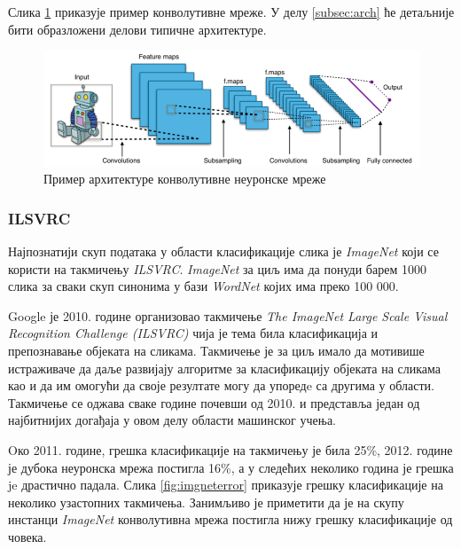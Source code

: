 \documentclass[a4paper]{article}
\begin{document}
Слика \ref{fig:cnn} приказује пример конволутивне мреже. У делу \ref{subsec:arch} ће детаљније бити образложени делови типичне архитектуре.

\begin{figure}[h!]
\begin{center}
\includegraphics[width=\textwidth]{resources/typical-cnn.png}
\end{center}
\caption{Пример архитектуре конволутивне неуронске мреже}
\label{fig:cnn}
\end{figure}

\subsubsection{ILSVRC}
Најпознатији скуп података у области класификације слика је \textit{ImageNet} који се
користи на такмичењу \textit{ILSVRC}. \textit{ImageNet} за циљ има да понуди барем 1000 слика
за сваки скуп синонима у бази \textit{WordNet} којих има преко 100 000.

Google је 2010. године организовао такмичење \textit{The ImageNet Large Scale Visual Recognition Challenge (ILSVRC)}
чија је тема била класификација и препознавање објеката на сликама. Такмичење је за циљ имало да мотивише истраживаче
да даље развијају алгоритме за класификацију објеката на сликама као и да им омогући да своје резултате
могу да упоредe са другима у области. Такмичење се оджава сваке године почевши од 2010. и представља један од
најбитнијих догађаја у овом делу области машинског учења.

Oко 2011. године, грешка класификације на такмичењу је била 25\%, 2012. године је дубока
неуронска мрежа постигла 16\%, а у следећих неколико година је грешка je драстично падала. Слика \ref{fig:imgneterror}
приказује грешку класификације на неколико узастопних такмичења. Занимљиво је приметити да је на
скупу инстанци \textit{ImageNet} конволутивна мрежа постигла нижу грешку класификације од човека.
\end{document}
